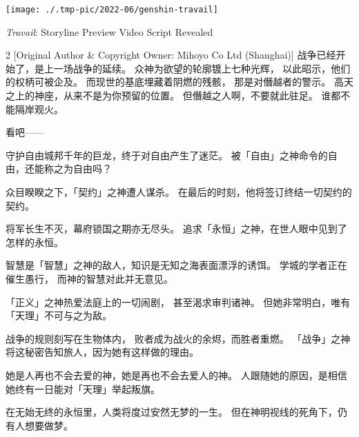 \documentclass[a4paper,11pt]{article}
\begin{document}
\begin{tcolorbox}[arc=0pt,colback=white,colframe=white,boxsep=0pt,boxrule=0pt,width=\textwidth,height=\textheight-9em-1.5em,top=0pt,bottom=1pt,left=0pt,right=0pt]
	\begin{minipage}[b][\textheight-9.5em][t]{31em}
		\texttt{[image: ./.tmp-pic/2022-06/genshin-travail]}\par\vfill
		\begin{minipage}{\linewidth}
			\Huge
			\bfseries
			\raggedright
			\textit{Travail}: Storyline Preview Video Script Revealed
		\end{minipage}\par
		\vfill
		\par
		\begin{multicols}{2}
			[{\small Original Author \& Copyright Owner: Mihoyo Co Ltd (Shanghai)}]
			\normalsize
			战争已经开始了，是上一场战争的延续。
			众神为欲望的轮廓镀上七种光辉，
			以此昭示，他们的权柄可被企及。
			而现世的基底埋藏着阴燃的残骸，
			那是对僭越者的警示。
			高天之上的神座，从来不是为你预留的位置。
			但僭越之人啊，不要就此驻足。
			谁都不能隔岸观火。\par
			看吧——\par
			守护自由城邦千年的巨龙，终于对自由产生了迷茫。
			被「自由」之神命令的自由，还能称之为自由吗？\par
			众目睽睽之下，「契约」之神遭人谋杀。
			在最后的时刻，他将签订终结一切契约的契约。\par
			将军长生不灭，幕府锁国之期亦无尽头。
			追求「永恒」之神，在世人眼中见到了怎样的永恒。\par
			智慧是「智慧」之神的敌人，知识是无知之海表面漂浮的诱饵。
			学城的学者正在催生愚行，
			而神的智慧对此并无意见。\par
			「正义」之神热爱法庭上的一切闹剧，
			甚至渴求审判诸神。
			但她非常明白，唯有「天理」不可与之为敌。\par
			战争的规则刻写在生物体内，
			败者成为战火的余烬，而胜者重燃。
			「战争」之神将这秘密告知旅人，因为她有这样做的理由。\par
			她是人再也不会去爱的神，她是再也不会去爱人的神。
			人跟随她的原因，是相信她终有一日能对「天理」举起叛旗。\par
			在无始无终的永恒里，人类将度过安然无梦的一生。
			但在神明视线的死角下，仍有人想要做梦。

\end{multicols}
\end{minipage}
\end{tcolorbox}
\end{document}
